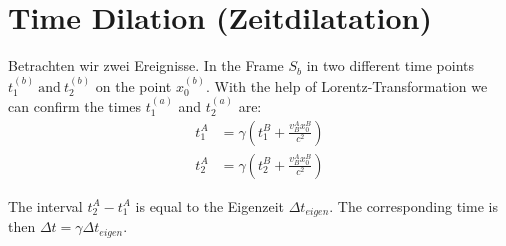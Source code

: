 \documentclass{report}
\begin{document}
\newpage
{}

\section{Time Dilation (Zeitdilatation)}
Betrachten wir zwei Ereignisse. In the Frame $S_b$ in two different time points $t_1^{(b)} \ \textrm{and} \ t_2^{(b)}$ on the point $x_0^{(b)}$. With the help of Lorentz-Transformation we can confirm the times $t_1^{(a)}$ and $t_2^{(a)}$ are:
\begin{equation}
\begin{aligned}
    t_1^A &= \gamma \left(t_1^B + \frac{v_B^A x_0^B}{c^2}\right) \\
    t_2^A &= \gamma \left(t_2^B + \frac{v_B^A x_0^B}{c^2}\right)
\end{aligned}
\end{equation}

The interval $t_2^A - t_1^A$ is equal to the Eigenzeit \emph{$\Delta t_{eigen}$}. The corresponding time is then $\Delta t = \gamma \Delta t_{eigen}$.
\end{document}

